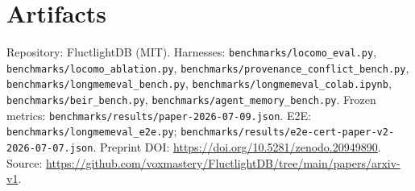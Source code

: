\documentclass[11pt]{article}
\begin{document}
\section*{Artifacts}
Repository: FluctlightDB (MIT). Harnesses: \texttt{benchmarks/locomo\_eval.py},
\texttt{benchmarks/locomo\_ablation.py},
\texttt{benchmarks/provenance\_conflict\_bench.py},
\texttt{benchmarks/longmemeval\_bench.py}, \texttt{benchmarks/longmemeval\_colab.ipynb},
\texttt{benchmarks/beir\_bench.py}, \texttt{benchmarks/agent\_memory\_bench.py}.
Frozen metrics: \texttt{benchmarks/results/paper-2026-07-09.json}. E2E:
\texttt{benchmarks/longmemeval\_e2e.py};
\texttt{benchmarks/results/e2e-cert-paper-v2-2026-07-07.json}. Preprint DOI:
\url{https://doi.org/10.5281/zenodo.20949890}. Source:
\url{https://github.com/voxmastery/FluctlightDB/tree/main/papers/arxiv-v1}.



\end{document}
